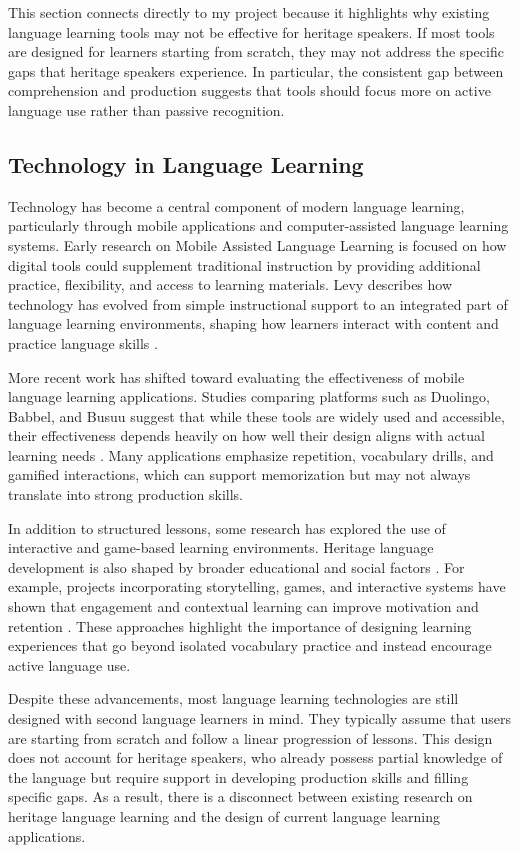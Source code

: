 \documentclass[12pt]{article}
\begin{document}
This section connects directly to my project because it highlights why existing language learning tools may not be effective for heritage speakers. If most tools are designed for learners starting from scratch, they may not address the specific gaps that heritage speakers experience. In particular, the consistent gap between comprehension and production suggests that tools should focus more on active language use rather than passive recognition.

\subsection{Technology in Language Learning}

Technology has become a central component of modern language learning, particularly through mobile applications and computer-assisted language learning systems. Early research on Mobile Assisted Language Learning is focused on how digital tools could supplement traditional instruction by providing additional practice, flexibility, and access to learning materials. Levy describes how technology has evolved from simple instructional support to an integrated part of language learning environments, shaping how learners interact with content and practice language skills \cite{levy2009technology}.

More recent work has shifted toward evaluating the effectiveness of mobile language learning applications. Studies comparing platforms such as Duolingo, Babbel, and Busuu suggest that while these tools are widely used and accessible, their effectiveness depends heavily on how well their design aligns with actual learning needs \cite{muckenhumer2023efficacy}. Many applications emphasize repetition, vocabulary drills, and gamified interactions, which can support memorization but may not always translate into strong production skills.

In addition to structured lessons, some research has explored the use of interactive and game-based learning environments. Heritage language development is also shaped by broader educational and social factors \cite{byrnes2005heritage}. For example, projects incorporating storytelling, games, and interactive systems have shown that engagement and contextual learning can improve motivation and retention \cite{papadopoulos2013aladdin}. These approaches highlight the importance of designing learning experiences that go beyond isolated vocabulary practice and instead encourage active language use.

Despite these advancements, most language learning technologies are still designed with second language learners in mind. They typically assume that users are starting from scratch and follow a linear progression of lessons. This design does not account for heritage speakers, who already possess partial knowledge of the language but require support in developing production skills and filling specific gaps. As a result, there is a disconnect between existing research on heritage language learning and the design of current language learning applications.
\end{document}
